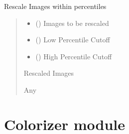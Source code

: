 \documentclass[letterpaper,10pt,english]{sphinxmanual}
\begin{document}
\begin{fulllineitems}
\label{\detokenize{Coloring:Coloring.rescale_images}}
\pysigstartsignatures
{}
\pysigstopsignatures
\sphinxAtStartPar
Rescale Images within percentiles
\begin{quote}\begin{description}
\begin{itemize}
\item {} 
\sphinxAtStartPar
{} () \textendash{} Images to be rescaled

\item {} 
\sphinxAtStartPar
{} () \textendash{} Low Percentile Cutoff

\item {} 
\sphinxAtStartPar
{} () \textendash{} High Percentile Cutoff

\end{itemize}

\sphinxAtStartPar
Rescaled Images

\sphinxAtStartPar
Any

\end{description}\end{quote}

\end{fulllineitems}


\sphinxstepscope


\section{Colorizer module}
\label{\detokenize{Colorizer:module-Colorizer}}\label{\detokenize{Colorizer:colorizer-module}}\label{\detokenize{Colorizer::doc}}
\end{document}

